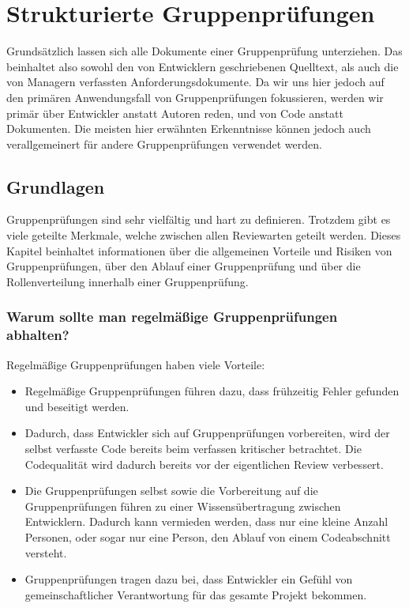 \documentclass[	%
		fontsize=11pt,  %
		a4paper,	    %
		ngerman,		%
		sans,			%
		f4,				%
	]{HsH-report}		%
\begin{document}
\section{Strukturierte Gruppenprüfungen}

Grundsätzlich lassen sich alle Dokumente einer Gruppenprüfung unterziehen. Das
beinhaltet also sowohl den von Entwicklern geschriebenen Quelltext, als auch
die von Managern verfassten Anforderungsdokumente. Da wir uns hier jedoch auf
den primären Anwendungsfall von Gruppenprüfungen fokussieren, werden wir primär
über Entwickler anstatt Autoren reden, und von Code anstatt Dokumenten. Die
meisten hier erwähnten Erkenntnisse können jedoch auch verallgemeinert für
andere Gruppenprüfungen verwendet werden.

\subsection{Grundlagen} \label{section: basics}

Gruppenprüfungen sind sehr vielfältig und hart zu definieren. Trotzdem gibt es
viele geteilte Merkmale, welche zwischen allen Reviewarten geteilt werden.
Dieses Kapitel beinhaltet informationen über die allgemeinen Vorteile und
Risiken von Gruppenprüfungen, über den Ablauf einer Gruppenprüfung und über die
Rollenverteilung innerhalb einer Gruppenprüfung.

\subsubsection{Warum sollte man regelmäßige Gruppenprüfungen abhalten?}

Regelmäßige Gruppenprüfungen haben viele Vorteile:

\begin{itemize}
	\item Regelmäßige Gruppenprüfungen führen dazu, dass frühzeitig Fehler gefunden und
	      beseitigt werden.
	\item Dadurch, dass Entwickler sich auf Gruppenprüfungen vorbereiten, wird der selbst
	      verfasste Code bereits beim verfassen kritischer betrachtet. Die Codequalität
	      wird dadurch bereits vor der eigentlichen Review verbessert.
	\item Die Gruppenprüfungen selbst sowie die Vorbereitung auf die Gruppenprüfungen
	      führen zu einer Wissensübertragung zwischen Entwicklern. Dadurch kann vermieden
	      werden, dass nur eine kleine Anzahl Personen, oder sogar nur eine Person, den
	      Ablauf von einem Codeabschnitt versteht.
	\item Gruppenprüfungen tragen dazu bei, dass Entwickler ein Gefühl von
	      gemeinschaftlicher Verantwortung für das gesamte Projekt bekommen.
\end{itemize}
\end{document}
